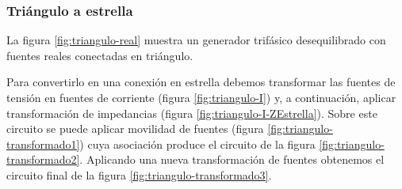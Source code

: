 \subsubsection{Triángulo a estrella}

La figura \ref{fig:triangulo-real} muestra un generador trifásico desequilibrado con fuentes reales conectadas en triángulo.

Para convertirlo en una conexión en estrella debemos transformar las fuentes de tensión en fuentes de corriente (figura \ref{fig:triangulo-I}) y, a continuación, aplicar transformación de impedancias (figura \ref{fig:triangulo-I-ZEstrella}). Sobre este circuito se puede aplicar movilidad de fuentes (figura \ref{fig:triangulo-transformado1}) cuya asociación produce el circuito de la figura \ref{fig:triangulo-transformado2}. Aplicando una nueva transformación de fuentes obtenemos el circuito final de la figura \ref{fig:triangulo-transformado3}.

